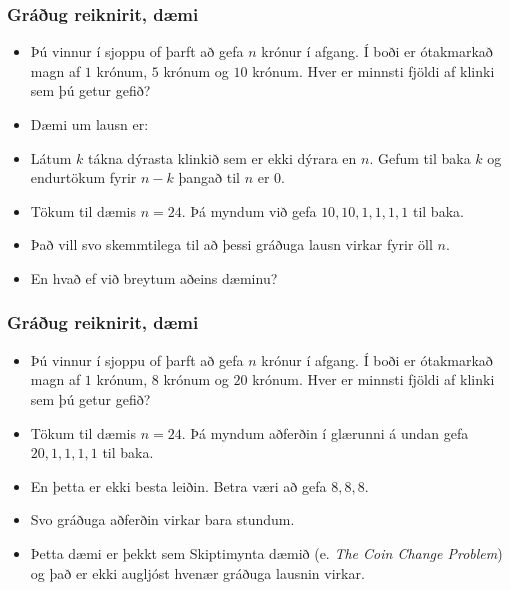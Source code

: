 \documentclass{beamer}
\begin{document}
\begin{frame}
	\frametitle{Gráðug reiknirit, dæmi}
\begin{itemize}
	\item<1-> 
		Þú vinnur í sjoppu of þarft að gefa $n$ krónur í afgang. 
		Í boði er ótakmarkað magn af $1$ krónum, $5$ krónum og $10$ krónum.
		Hver er minnsti fjöldi af klinki sem þú getur gefið?
	\item<2-> Dæmi um lausn er:
	\item<3-> Látum $k$ tákna dýrasta klinkið sem er ekki dýrara en $n$. Gefum til baka $k$ og endurtökum fyrir $n - k$ þangað til $n$ er $0$.
	\item<4-> Tökum til dæmis $n = 24$. Þá myndum við gefa $10, 10, 1, 1, 1, 1$ til baka.
	\item<5-> Það vill svo skemmtilega til að þessi gráðuga lausn virkar fyrir öll $n$.
	\item<6-> En hvað ef við breytum aðeins dæminu?
\end{itemize}
\end{frame}

\begin{frame}
	\frametitle{Gráðug reiknirit, dæmi}
\begin{itemize}
	\item<1-> 
		Þú vinnur í sjoppu of þarft að gefa $n$ krónur í afgang. 
		Í boði er ótakmarkað magn af $1$ krónum, $8$ krónum og $20$ krónum.
		Hver er minnsti fjöldi af klinki sem þú getur gefið?
	\item<2-> Tökum til dæmis $n = 24$. Þá myndum aðferðin í glærunni á undan gefa $20, 1, 1, 1, 1$ til baka.
	\item<3-> En þetta er ekki besta leiðin. Betra væri að gefa $8, 8, 8$.
	\item<4-> Svo gráðuga aðferðin virkar bara stundum.
	\item<5-> Þetta dæmi er þekkt sem Skiptimynta dæmið (e. \emph{The Coin Change Problem}) og það er ekki augljóst hvenær gráðuga lausnin virkar.
\end{itemize}
\end{frame}
\end{document}
